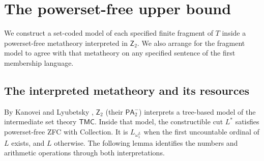 \documentclass[11pt,a4paper]{article}
\numberwithin{equation}{section}
\theoremstyle{definition}
\theoremstyle{remark}
\newcommand{\Ztwo}{\mathsf{Z}_2}
\begin{document}
\section{The powerset-free upper bound}\label{sec:upper}
We construct a set-coded model of each specified finite fragment of $T$ inside a powerset-free metatheory interpreted in $\Ztwo$. We also arrange for the fragment model to agree with that metatheory on any specified sentence of the first membership language.

\subsection{The interpreted metatheory and its resources}
By Kanovei and Lyubetsky \cite[Theorems 5.2 and 1.2]{kl}, $\Ztwo$ (their $\mathsf{PA}_2^-$) interprets a tree-based model of the intermediate set theory $\mathsf{TMC}$. Inside that model, the constructible cut $L^*$ satisfies powerset-free ZFC with Collection. It is $L_{\omega_1^L}$ when the first uncountable ordinal of $L$ exists, and $L$ otherwise. The following lemma identifies the numbers and arithmetic operations through both interpretations.
\end{document}

